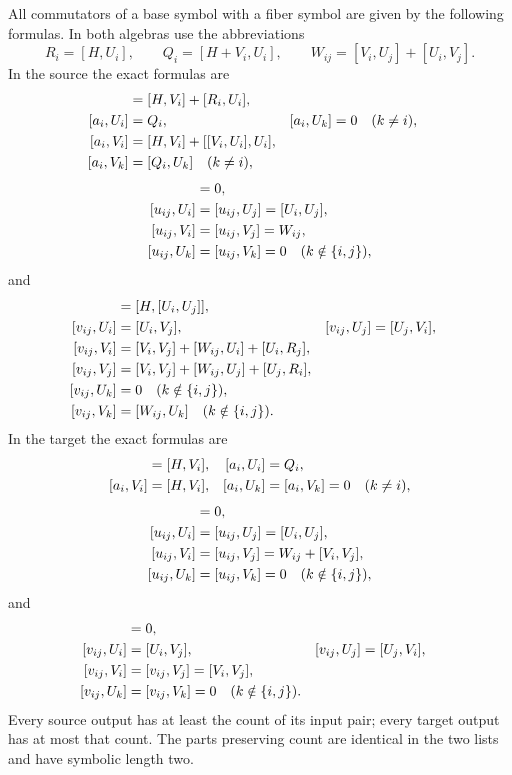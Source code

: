 \begin{lemma}\label{lem:action-tables}
All commutators of a base symbol with a fiber symbol are given by the
following formulas.  In both algebras use the abbreviations
\[
 R_i=[H,U_i],\qquad Q_i=[H+V_i,U_i],\qquad
 W_{ij}=[V_i,U_j]+[U_i,V_j].
\]
In the source the exact formulas are
\begin{align}
 [a_i,H]&=[H,V_i]+[R_i,U_i],\notag\\
 [a_i,U_i]&=Q_i,& [a_i,U_k]&=0\quad(k\ne i),\notag\\
 [a_i,V_i]&=[H,V_i]+[[V_i,U_i],U_i],\notag\\
 [a_i,V_k]&=[Q_i,U_k]\quad(k\ne i),
 \label{eq:source-a-actions}
\end{align}
\begin{align}
 [u_{ij},H]&=0,\notag\\
 [u_{ij},U_i]&=[u_{ij},U_j]=[U_i,U_j],\notag\\
 [u_{ij},V_i]&=[u_{ij},V_j]=W_{ij},\notag\\
 [u_{ij},U_k]&=[u_{ij},V_k]=0\quad(k\notin\{i,j\}),
 \label{eq:source-u-actions}
\end{align}
and
\begin{align}
 [v_{ij},H]&=[H,[U_i,U_j]],\notag\\
 [v_{ij},U_i]&=[U_i,V_j],&
 [v_{ij},U_j]&=[U_j,V_i],\notag\\
 [v_{ij},V_i]&=[V_i,V_j]+[W_{ij},U_i]+[U_i,R_j],\notag\\
 [v_{ij},V_j]&=[V_i,V_j]+[W_{ij},U_j]+[U_j,R_i],\notag\\
 [v_{ij},U_k]&=0\quad(k\notin\{i,j\}),\notag\\
 [v_{ij},V_k]&=[W_{ij},U_k]\quad(k\notin\{i,j\}).
 \label{eq:source-v-actions}
\end{align}
In the target the exact formulas are
\begin{align}
 [a_i,H]&=[H,V_i],& [a_i,U_i]&=Q_i,\notag\\
 [a_i,V_i]&=[H,V_i],&
 [a_i,U_k]&=[a_i,V_k]=0\quad(k\ne i),
 \label{eq:target-a-actions}
\end{align}
\begin{align}
 [u_{ij},H]&=0,\notag\\
 [u_{ij},U_i]&=[u_{ij},U_j]=[U_i,U_j],\notag\\
 [u_{ij},V_i]&=[u_{ij},V_j]=W_{ij}+[V_i,V_j],\notag\\
 [u_{ij},U_k]&=[u_{ij},V_k]=0\quad(k\notin\{i,j\}),
 \label{eq:target-u-actions}
\end{align}
and
\begin{align}
 [v_{ij},H]&=0,\notag\\
 [v_{ij},U_i]&=[U_i,V_j],&
 [v_{ij},U_j]&=[U_j,V_i],\notag\\
 [v_{ij},V_i]&=[v_{ij},V_j]=[V_i,V_j],\notag\\
 [v_{ij},U_k]&=[v_{ij},V_k]=0\quad(k\notin\{i,j\}).
 \label{eq:target-v-actions}
\end{align}
Every source output has at least the count of its input pair; every
target output has at most that count.  The parts preserving count
are identical in the two lists and have symbolic length two.
\end{lemma}

